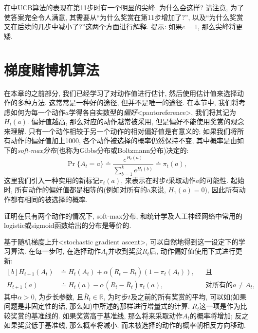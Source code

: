 \begin{exer}[UCB尖峰]
在中UCB算法的表现在第11步时有一个明显的尖峰. 为什么会这样? 请注意, 为了使答案完全令人满意, 其需要从``为什么奖赏在第11步增加了?'', 以及``为什么奖赏又在后续的几步中减小了?''这两个方面进行解释. 提示: 如果$c = 1$, 那么尖峰将更矮.
\end{exer}

\section{梯度赌博机算法}\label{sec:2.8}

在本章的之前部分, 我们已经学习了对动作值进行估计, 然后使用估计值来选择动作的多种方法. 这常常是一种好的途径, 但并不是唯一的途径. 在本节中, 我们将考虑如何为每一个动作$a$学得各自实数型的\emph{偏好}<pautoreference>, 我们将其记为$H_t(a)$. 偏好值越高, 那么对应的动作越常被采用, 但是偏好不能使用奖赏的观念来理解. 只有一个动作相较于另一个动作的相对偏好值是有意义的; 如果我们将所有动作的偏好值加上1000, 各个动作被选择的概率仍然保持不变, 其中概率是由如下的\emph{soft-max分布}(也称为Gibbs分布或Boltzmann分布)决定的:
\begin{equation}\label{eq:2.11}
\Pr\{A_t = a\} \doteq \frac{e^{H_t(a)}}{\sum_{b = 1}^{k} e^{H_t(b)}} \doteq \pi_t(a),
\end{equation}
这里我们引入一种实用的新标记$\pi_t(a)$, 来表示在时步$t$采取动作$a$的可能性. 起始时, 所有动作的偏好值都是相等的(例如对所有的a来说, $H_1(a) = 0$), 因此所有动作都有相同的被选择的概率.

\begin{exer}
证明在只有两个动作的情况下, soft-max分布, 和统计学及人工神经网络中常用的logistic或sigmoid函数给出的分布是等价的.
\end{exer}

基于随机梯度上升<stochastic gradient ascent>, 可以自然地得到这一设定下的学习算法. 在每一步时, 在选择动作$A_t$并收到奖赏$R_t$后, 动作偏好值使用下式进行更新:
\begin{equation}\label{eq:2.12}
\begin{aligned}[b]
H_{t + 1}(A_t) &\doteq H_t(A_t) + \alpha (R_t - \bar{R}_t)(1 - \pi_t(A_t)), &&\text{且} \\
H_{t + 1}(a) &\doteq H_t(a) - \alpha(R_t - \bar{R}_t) \pi_t(a), &&\text{对所有的}a \neq A_t,
\end{aligned}
\end{equation}
其中$\alpha > 0$, 为步长参数, 且$\bar{R}_t \in \mathbb{R}$, 为时步$t$及之前的所有奖赏的平均, 可以如(如果问题是非固定性的话, 那么如)中所述的那样进行增量式的计算. $\bar{R}_t$这一项是作为比较奖赏的基准线的. 如果奖赏高于基准线, 那么将来采取动作$A_t$的概率将增加; 反之如果奖赏低于基准线, 那么概率将减小. 而未被选择的动作的概率朝相反方向移动.

